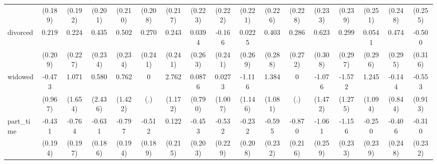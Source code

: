 {\begin{tabular}{l*{16}{c}}
                    &     (0.189)         &     (0.192)         &     (0.201)         &     (0.210)         &     (0.208)         &     (0.217)         &     (0.223)         &     (0.222)         &     (0.221)         &     (0.226)         &     (0.228)         &     (0.233)         &     (0.239)         &     (0.251)         &     (0.248)         &     (0.255)         \\
[1em]
divorced            &       0.219         &       0.224         &       0.435         &       0.502\sym{*}  &       0.270         &       0.243         &      0.0394         &      -0.166         &      0.0225         &       0.403         &       0.286         &       0.623\sym{*}  &       0.299         &      0.0541         &       0.474         &      -0.500         \\
                    &     (0.209)         &     (0.227)         &     (0.234)         &     (0.234)         &     (0.241)         &     (0.241)         &     (0.263)         &     (0.241)         &     (0.269)         &     (0.288)         &     (0.272)         &     (0.308)         &     (0.297)         &     (0.296)         &     (0.295)         &     (0.316)         \\
[1em]
widowed             &      -0.473         &       1.071         &       0.580         &       0.762         &           0         &       2.762\sym{*}  &      0.0876         &      0.0273         &      -1.116         &       1.384         &           0         &      -1.076         &      -1.572         &       1.245         &      -0.144         &      -0.553         \\
                    &     (0.967)         &     (1.654)         &     (2.436)         &     (1.422)         &         (.)         &     (1.172)         &     (0.790)         &     (1.007)         &     (1.146)         &     (1.081)         &         (.)         &     (1.472)         &     (1.275)         &     (1.094)         &     (0.844)         &     (0.913)         \\
[1em]
part\_time           &      -0.431\sym{*}  &      -0.764\sym{***}&      -0.631\sym{***}&      -0.797\sym{***}&      -0.512\sym{**} &       0.122         &      -0.453\sym{*}  &      -0.532\sym{*}  &      -0.232         &      -0.595\sym{*}  &      -0.870\sym{***}&      -1.061\sym{***}&      -1.156\sym{***}&      -0.250         &      -0.406         &      -0.310         \\
                    &     (0.194)         &     (0.197)         &     (0.186)         &     (0.194)         &     (0.189)         &     (0.215)         &     (0.203)         &     (0.229)         &     (0.208)         &     (0.232)         &     (0.216)         &     (0.259)         &     (0.233)         &     (0.239)         &     (0.248)         &     (0.232)         \\

\end{tabular}}
